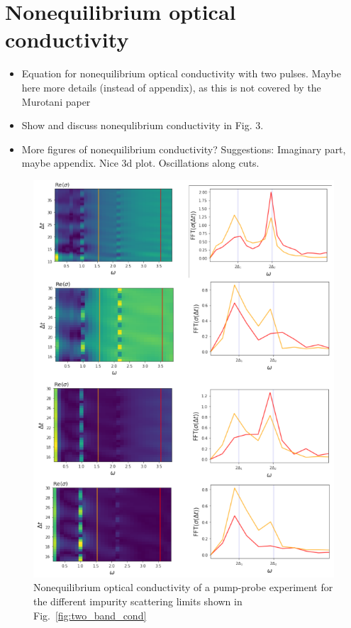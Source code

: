 \documentclass[aps,prb,reprint,noeprint,superscriptaddress]{revtex4-1}
\begin{document}
\section{Nonequilibrium optical conductivity}
\label{sec:noneq_cond}

\begin{itemize}
	\item Equation for nonequilibrium optical conductivity with two pulses. Maybe here more details (instead of appendix), as this is not covered by the Murotani paper
	\item Show and discuss nonequlibrium conductivity in Fig. 3.
	\item More figures of nonequilibrium conductivity? Suggestions: Imaginary part, maybe appendix. Nice 3d plot. Oscillations along cuts.
\end{itemize}


\begin{figure}[H]
    \centering
    \includegraphics[width=\columnwidth]{figures/noneq_cond.png}
    \caption{\label{fig:noneq_cond}%
    Nonequilibrium optical conductivity of a pump-probe experiment for the different impurity scattering limits shown in Fig.~\ref{fig:two_band_cond}}
\end{figure}%
\end{document}
